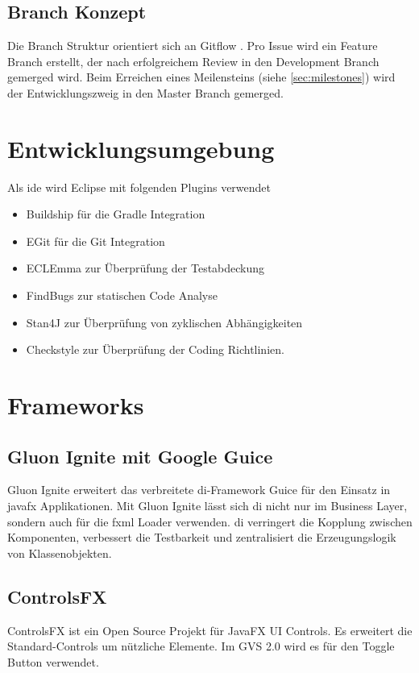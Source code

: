 \documentclass[11pt,a4paper,english,oneside]{book}
\numberwithin{equation}{chapter}
\begin{document}
	\subsection{Branch Konzept}
	Die Branch Struktur orientiert sich an Gitflow \cite{gitflow}. Pro Issue wird ein Feature Branch erstellt, der nach erfolgreichem Review in den Development Branch gemerged wird. Beim Erreichen eines Meilensteins (siehe \ref{sec:milestones}) wird der Entwicklungszweig in den Master Branch gemerged.
	
	
	
	\section{Entwicklungsumgebung}
	Als \gls{ide} wird Eclipse mit folgenden Plugins verwendet
	\begin{itemize}
		\item Buildship \cite{buildship} für die Gradle Integration
		\item EGit \cite{egit} für die Git Integration
		\item ECLEmma \cite{eclemma} zur Überprüfung der Testabdeckung
		\item FindBugs \cite{findbugs} zur statischen Code Analyse
		\item Stan4J \cite{stan4j} zur Überprüfung von zyklischen Abhängigkeiten
		\item Checkstyle \cite{checkstyle} zur Überprüfung der Coding Richtlinien.
	\end{itemize}
	
	
	
	\section{Frameworks}
	
	\subsection{Gluon Ignite mit Google Guice} \label{DI}
	Gluon Ignite \cite{gluonignite} erweitert das verbreitete \gls{di}-Framework Guice \cite{guice} für den Einsatz in \gls{javafx} Applikationen. Mit Gluon Ignite lässt sich \gls{di} nicht nur im Business Layer, sondern auch für die \gls{fxml} Loader verwenden. \gls{di} verringert die Kopplung zwischen Komponenten, verbessert die Testbarkeit und zentralisiert die Erzeugungslogik von Klassenobjekten.
	
	\subsection{ControlsFX}
	ControlsFX \cite{controlsfx} ist ein Open Source Projekt für JavaFX UI Controls. Es erweitert die Standard-Controls um nützliche Elemente. Im GVS 2.0 wird es für den Toggle Button verwendet. 
	
\end{document}
